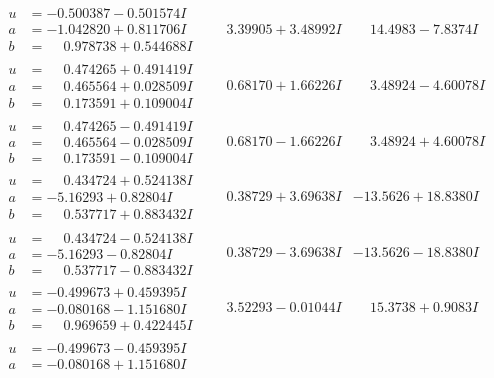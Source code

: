 \documentclass[1p]{elsarticle_modified}
\theoremstyle{definition}
\begin{document}
$$\begin{array}{c|c|c}
\begin{aligned}
u &= -0.500387 - 0.501574 I \\
a &= -1.042820 + 0.811706 I \\
b &= \phantom{-}0.978738 + 0.544688 I\end{aligned}
 & \phantom{-}3.39905 + 3.48992 I & \phantom{-}14.4983 - 7.8374 I \\ \hline\begin{aligned}
u &= \phantom{-}0.474265 + 0.491419 I \\
a &= \phantom{-}0.465564 + 0.028509 I \\
b &= \phantom{-}0.173591 + 0.109004 I\end{aligned}
 & \phantom{-}0.68170 + 1.66226 I & \phantom{-}3.48924 - 4.60078 I \\ \hline\begin{aligned}
u &= \phantom{-}0.474265 - 0.491419 I \\
a &= \phantom{-}0.465564 - 0.028509 I \\
b &= \phantom{-}0.173591 - 0.109004 I\end{aligned}
 & \phantom{-}0.68170 - 1.66226 I & \phantom{-}3.48924 + 4.60078 I \\ \hline\begin{aligned}
u &= \phantom{-}0.434724 + 0.524138 I \\
a &= -5.16293 + 0.82804 I \\
b &= \phantom{-}0.537717 + 0.883432 I\end{aligned}
 & \phantom{-}0.38729 + 3.69638 I & -13.5626 + 18.8380 I \\ \hline\begin{aligned}
u &= \phantom{-}0.434724 - 0.524138 I \\
a &= -5.16293 - 0.82804 I \\
b &= \phantom{-}0.537717 - 0.883432 I\end{aligned}
 & \phantom{-}0.38729 - 3.69638 I & -13.5626 - 18.8380 I \\ \hline\begin{aligned}
u &= -0.499673 + 0.459395 I \\
a &= -0.080168 - 1.151680 I \\
b &= \phantom{-}0.969659 + 0.422445 I\end{aligned}
 & \phantom{-}3.52293 - 0.01044 I & \phantom{-}15.3738 + 0.9083 I \\ \hline\begin{aligned}
u &= -0.499673 - 0.459395 I \\
a &= -0.080168 + 1.151680 I \\

\end{aligned}
\end{array}$$
\end{document}
